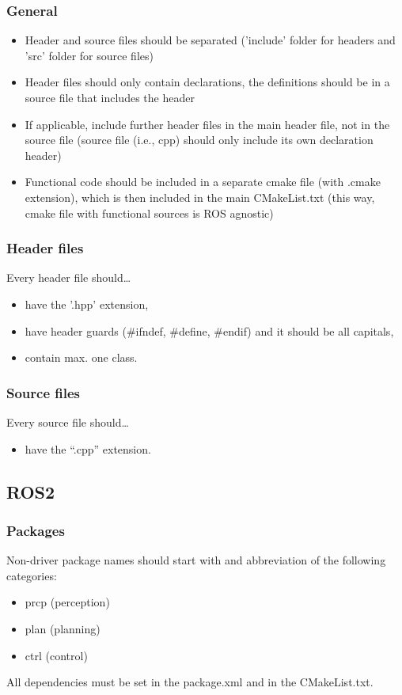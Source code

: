 \documentclass[sn-mathphys-num]{sn-jnl}%
\begin{document}
\subsubsection{General}
\begin{itemize}
    \item Header and source files should be separated ('include' folder for headers and 'src' folder for source files)
    \item Header files should only contain declarations, the definitions should be in a source file that includes the header
    \item If applicable, include further header files in the main header file, not in the source file (source file (i.e., cpp) should only include its own declaration header)
    \item Functional code should be included in a separate cmake file (with .cmake extension), which is then included in the main CMakeList.txt (this way, cmake file with functional sources is ROS agnostic)
\end{itemize}

\subsubsection{Header files}
Every header file should…
\begin{itemize}
    \item have the '.hpp' extension,
    \item have header guards (\#ifndef, \#define, \#endif) and it should be all capitals,
    \item contain max. one class.
\end{itemize}

\subsubsection{Source files}
Every source file should…
\begin{itemize}
    \item have the “.cpp” extension.
\end{itemize}

\subsection{ROS2}
\subsubsection{Packages}
Non-driver package names should start with and abbreviation of the following categories:
\begin{itemize}
    \item prcp (perception)
    \item plan (planning)
    \item ctrl (control)
\end{itemize}
All dependencies must be set in the package.xml and in the CMakeList.txt.
\end{document}
